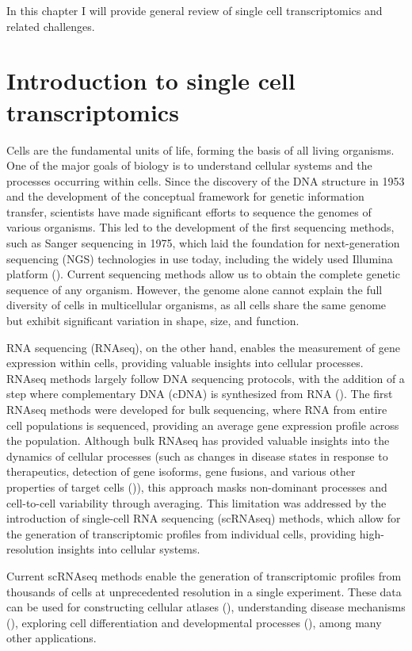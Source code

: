 In this chapter I will provide general review of single cell transcriptomics and related challenges.

\section{Introduction to single cell transcriptomics}

Cells are the fundamental units of life, forming the basis of all living organisms.
One of the major goals of biology is to understand cellular systems and the processes occurring within cells.
Since the discovery of the DNA structure in 1953
and the development of the conceptual framework for genetic information transfer,
scientists have made significant efforts to sequence the genomes of various organisms.
This led to the development of the first sequencing methods, such as Sanger sequencing in 1975,
which laid the foundation for next-generation sequencing (NGS) technologies in use today,
including the widely used Illumina platform (\cite{Heather2016}).
Current sequencing methods allow us to obtain the complete genetic sequence of any organism.
However, the genome alone cannot explain the full diversity of cells in multicellular organisms,
as all cells share the same genome but exhibit significant variation in shape, size, and function.

RNA sequencing (RNAseq), on the other hand, enables the measurement of gene expression within cells,
providing valuable insights into cellular processes.
RNAseq methods largely follow DNA sequencing protocols,
with the addition of a step where complementary DNA (cDNA) is synthesized from RNA (\cite{Heumos2023}).
The first RNAseq methods were developed for bulk sequencing, where RNA from entire cell populations is sequenced,
providing an average gene expression profile across the population.
Although bulk RNAseq has provided valuable insights into the dynamics of cellular processes
(such as changes in disease states in response to therapeutics, detection of gene isoforms, gene fusions,
and various other properties of target cells (\cite{Heumos2023})),
this approach masks non-dominant processes and cell-to-cell variability through averaging.
This limitation was addressed by the introduction of single-cell RNA sequencing (scRNAseq) methods,
which allow for the generation of transcriptomic profiles from individual cells,
providing high-resolution insights into cellular systems.

Current scRNAseq methods enable the generation of transcriptomic profiles from thousands of cells
at unprecedented resolution in a single experiment.
These data can be used for constructing cellular atlases (\cite{Rozenblatt2017}),
understanding disease mechanisms (\cite{Zhang2024}),
exploring cell differentiation and developmental processes (\cite{Skinner2024}), among many other applications.

